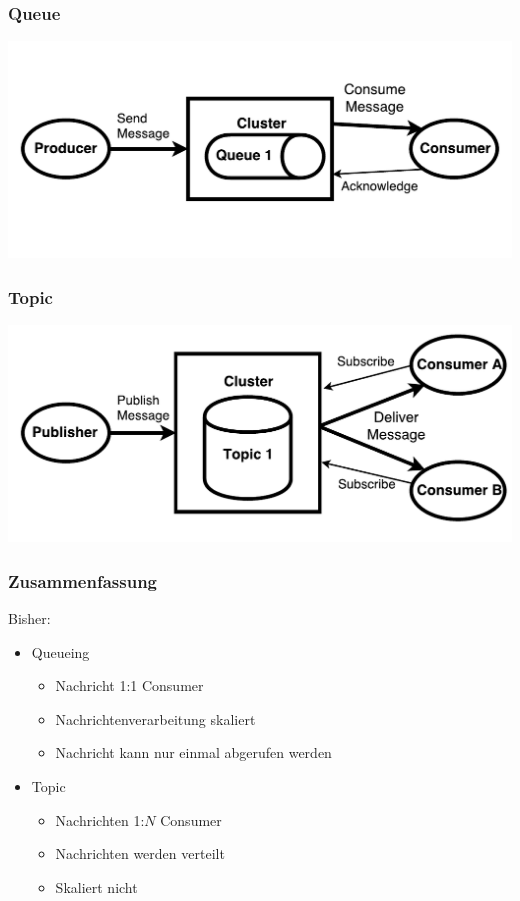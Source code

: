 \begin{frame}
\frametitle{Queue}
	\begin{center}
		\centering
		\includegraphics[scale=0.6]{figure/queue_draw.pdf}
	\end{center}
	
\end{frame}

\begin{frame}
\frametitle{Topic}
	\centering
	\includegraphics[scale=0.6]{figure/topic_draw.pdf}
	
\end{frame}

\begin{frame}
\frametitle{Zusammenfassung}

Bisher: 
\begin{itemize}
	\item Queueing
	\begin{itemize}
		\item Nachricht 1:1 Consumer
		\item Nachrichtenverarbeitung skaliert
		\item Nachricht kann nur einmal abgerufen werden
	\end{itemize}
	\item Topic
	\begin{itemize}
		\item Nachrichten 1:$N$ Consumer
		\item Nachrichten werden verteilt
		\item Skaliert nicht  			%
	\end{itemize}
\end{itemize}
\end{frame}

